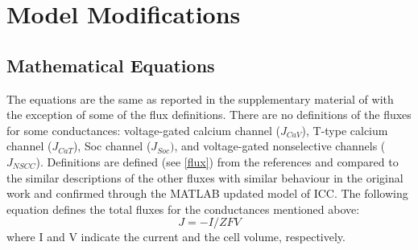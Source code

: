 \documentclass[fleqn,10pt]{physiome}
\begin{document}
\section{Model Modifications}
\subsection{Mathematical Equations} 
\label{eq:0}

The equations are the same as reported in the supplementary material of \citet{lees2014computational} with the
exception of some of the flux definitions. There are no definitions of the fluxes for some conductances: voltage-gated calcium channel ($J_{CaV}$), T-type calcium channel ($J_{CaT}$), Soc channel ($J_{Soc})$, and voltage-gated nonselective channels ($J_{NSCC}$). Definitions are defined (see \autoref{flux}) from the references and compared to the similar descriptions of the other fluxes with similar behaviour in the original work and confirmed through the MATLAB updated model of ICC. 
The following equation defines the total fluxes for the conductances mentioned above: 
\begin{equation}
J = - I/ZFV  \label{flux}  
\end{equation}
where I and V indicate the current and the cell volume, respectively.
\end{document}
